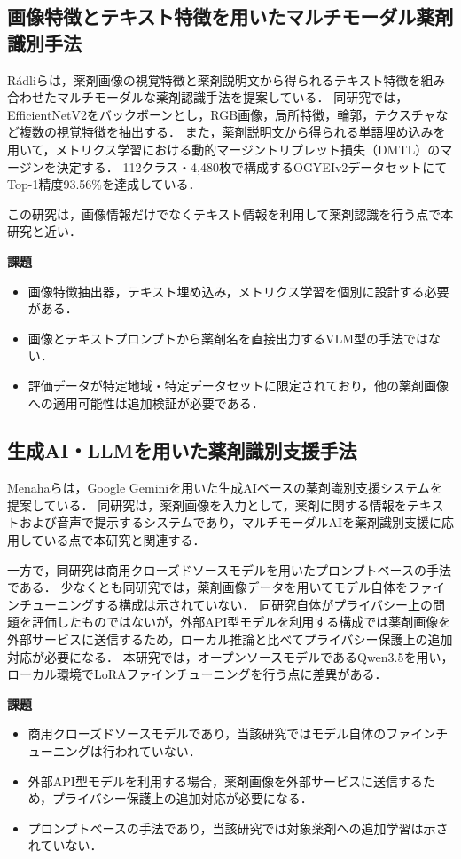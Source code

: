 \documentclass[dvipdfmx]{jsarticle}
\begin{document}
\subsection{画像特徴とテキスト特徴を用いたマルチモーダル薬剤識別手法}

Rádliら\cite{radli2024metric}は，薬剤画像の視覚特徴と薬剤説明文から得られるテキスト特徴を組み合わせたマルチモーダルな薬剤認識手法を提案している．
同研究では，EfficientNetV2をバックボーンとし，RGB画像，局所特徴，輪郭，テクスチャなど複数の視覚特徴を抽出する．
また，薬剤説明文から得られる単語埋め込みを用いて，メトリクス学習における動的マージントリプレット損失（DMTL）のマージンを決定する．
112クラス・4,480枚で構成するOGYEIv2データセットにてTop-1精度93.56\%を達成している\cite{radli2024word}．

この研究は，画像情報だけでなくテキスト情報を利用して薬剤認識を行う点で本研究と近い．

\textbf{課題}
\begin{itemize}
  \item 画像特徴抽出器，テキスト埋め込み，メトリクス学習を個別に設計する必要がある．
  \item 画像とテキストプロンプトから薬剤名を直接出力するVLM型の手法ではない．
  \item 評価データが特定地域・特定データセットに限定されており，他の薬剤画像への適用可能性は追加検証が必要である．
\end{itemize}

\subsection{生成AI・LLMを用いた薬剤識別支援手法}

Menahaら\cite{gemini2024pill}は，Google Geminiを用いた生成AIベースの薬剤識別支援システムを提案している．
同研究は，薬剤画像を入力として，薬剤に関する情報をテキストおよび音声で提示するシステムであり，マルチモーダルAIを薬剤識別支援に応用している点で本研究と関連する．

一方で，同研究は商用クローズドソースモデルを用いたプロンプトベースの手法である．
少なくとも同研究では，薬剤画像データを用いてモデル自体をファインチューニングする構成は示されていない．
同研究自体がプライバシー上の問題を評価したものではないが，外部API型モデルを利用する構成では薬剤画像を外部サービスに送信するため，ローカル推論と比べてプライバシー保護上の追加対応が必要になる．
本研究では，オープンソースモデルであるQwen3.5を用い，ローカル環境でLoRAファインチューニングを行う点に差異がある．

\textbf{課題}
\begin{itemize}
  \item 商用クローズドソースモデルであり，当該研究ではモデル自体のファインチューニングは行われていない．
  \item 外部API型モデルを利用する場合，薬剤画像を外部サービスに送信するため，プライバシー保護上の追加対応が必要になる．
  \item プロンプトベースの手法であり，当該研究では対象薬剤への追加学習は示されていない．
\end{itemize}
\end{document}
